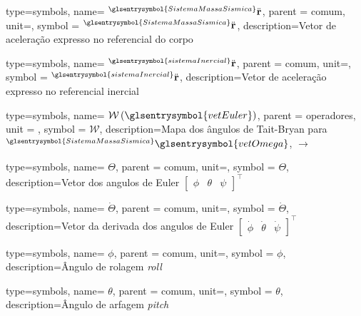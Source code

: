 {type=symbols,
  name= \ensuremath{{}^{\glsentrysymbol{SistemaMassaSismica}}\ddot{\mathbf{r}}},
  parent = {comum},
  unit=\unexpanded{\metre\per\second\squared},
  symbol = \ensuremath{{}^{\glsentrysymbol{SistemaMassaSismica}}\ddot{\mathbf{r}}},
  description={Vetor de aceleração expresso no referencial do corpo}
}

{type=symbols,
  name= \ensuremath{{}^{\glsentrysymbol{sistemaInercial}}\ddot{\mathbf{r}}},
  parent = {comum},
  unit=\unexpanded{\si{\metre\per\second\squared}},
  symbol = \ensuremath{{}^{\glsentrysymbol{sistemaInercial}}\ddot{\mathbf{r}}},
  description={Vetor de aceleração expresso no referencial inercial}
}

{type=symbols,
  name= \ensuremath{\mathcal{W}\left(\glsentrysymbol{vetEuler}\right)},
  parent = {operadores},
  unit = \unexpanded{},
  symbol = \ensuremath{\mathcal{W}},
  description={Mapa dos ângulos de Tait-Bryan para \ensuremath{{}^{\glsentrysymbol{SistemaMassaSismica}}\glsentrysymbol{vetOmega}}, \ensuremath{\rightarrow} }
}

{type=symbols,
  name= \ensuremath{\boldsymbol{\varTheta}},
  parent = {comum},
  unit=\unexpanded{\si{\radian}},
  symbol = \ensuremath{\boldsymbol{\varTheta}},
  description={Vetor dos angulos de Euler \ensuremath{\left[\begin{array}{ccc}
            \phi & \theta & \psi\end{array}\right]^{\intercal}}}
}

{type=symbols,
  name= \ensuremath{\dot{\boldsymbol{\varTheta}}},
  parent = {comum},
  unit=\unexpanded{\si{\radian\per\second}},
  symbol = \ensuremath{\dot{\boldsymbol{\varTheta}}},
  description={Vetor da derivada dos angulos de Euler \ensuremath{\left[\begin{array}{ccc}
            \dot{\phi} & \dot{\theta} & \dot{\psi}\end{array}\right]^{\intercal}}}
}

{type=symbols,
  name= \ensuremath{\phi},
  parent = {comum},
  unit=\unexpanded{\si{\radian}},
  symbol = \ensuremath{\phi},
  description={Ângulo de rolagem \emph{roll}}
}

{type=symbols,
  name= \ensuremath{\theta},
  parent = {comum},
  unit=\unexpanded{\si{\radian}},
  symbol = \ensuremath{\theta},
  description={Ângulo de arfagem \emph{pitch}}
}

